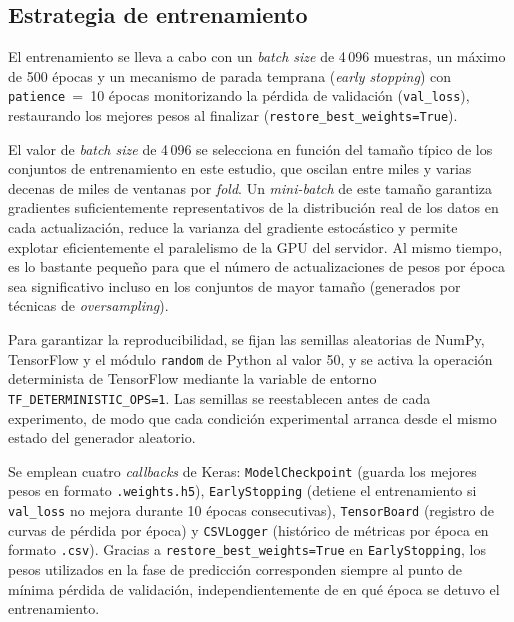 \subsection{Estrategia de entrenamiento}
\label{subsec:estrategia_entrenamiento}

El entrenamiento se lleva a cabo con un \textit{batch size} de 4\,096 muestras, un máximo de 500 épocas y un mecanismo de parada temprana (\textit{early stopping}) con \texttt{patience}~=~10 épocas monitorizando la pérdida de validación (\texttt{val\_loss}), restaurando los mejores pesos al finalizar (\texttt{restore\_best\_weights=True}).

El valor de \textit{batch size} de 4\,096 se selecciona en función del tamaño típico de los conjuntos de entrenamiento en este estudio, que oscilan entre miles y varias decenas de miles de ventanas por \textit{fold}. Un \textit{mini-batch} de este tamaño garantiza gradientes suficientemente representativos de la distribución real de los datos en cada actualización, reduce la varianza del gradiente estocástico y permite explotar eficientemente el paralelismo de la GPU del servidor. Al mismo tiempo, es lo bastante pequeño para que el número de actualizaciones de pesos por época sea significativo incluso en los conjuntos de mayor tamaño (generados por técnicas de \textit{oversampling}).

Para garantizar la reproducibilidad, se fijan las semillas aleatorias de NumPy, TensorFlow y el módulo \texttt{random} de Python al valor 50, y se activa la operación determinista de TensorFlow mediante la variable de entorno \texttt{TF\_DETERMINISTIC\_OPS=1}. Las semillas se reestablecen antes de cada experimento, de modo que cada condición experimental arranca desde el mismo estado del generador aleatorio.

Se emplean cuatro \textit{callbacks} de Keras: \texttt{ModelCheckpoint} (guarda los mejores pesos en formato \texttt{.weights.h5}), \texttt{EarlyStopping} (detiene el entrenamiento si \texttt{val\_loss} no mejora durante 10 épocas consecutivas), \texttt{TensorBoard} (registro de curvas de pérdida por época) y \texttt{CSVLogger} (histórico de métricas por época en formato \texttt{.csv}). Gracias a \texttt{restore\_best\_weights=True} en \texttt{EarlyStopping}, los pesos utilizados en la fase de predicción corresponden siempre al punto de mínima pérdida de validación, independientemente de en qué época se detuvo el entrenamiento.

